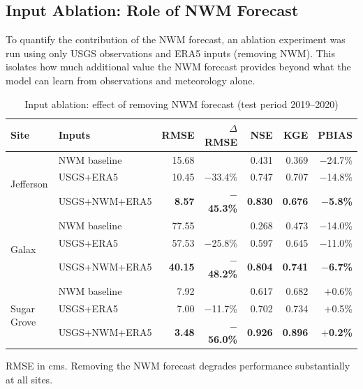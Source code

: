 \documentclass[11pt]{article}
\begin{document}
\subsection{Input Ablation: Role of NWM Forecast}

To quantify the contribution of the NWM forecast, an ablation experiment was run using only USGS observations and ERA5 inputs (removing NWM). This isolates how much additional value the NWM forecast provides beyond what the model can learn from observations and meteorology alone.

\begin{table}[h]
\centering
\caption{Input ablation: effect of removing NWM forecast (test period 2019--2020)}
\label{tab:ablation}
\begin{tabular}{ll rrrrr}
\toprule
\textbf{Site} & \textbf{Inputs} & \textbf{RMSE} & \textbf{$\Delta$RMSE} & \textbf{NSE} & \textbf{KGE} & \textbf{PBIAS} \\
\midrule
\multirow{3}{*}{Jefferson}
  & NWM baseline      & 15.68 &        & 0.431 & 0.369 & $-$24.7\% \\
  & USGS+ERA5         & 10.45 & \textcolor{improved}{$-$33.4\%} & 0.747 & 0.707 & $-$14.8\% \\
  & USGS+NWM+ERA5     & \textbf{8.57}  & \textcolor{improved}{$-$\textbf{45.3\%}} & \textbf{0.830} & \textbf{0.676} & \textbf{$-$5.8\%} \\
\midrule
\multirow{3}{*}{Galax}
  & NWM baseline      & 77.55 &        & 0.268 & 0.473 & $-$14.0\% \\
  & USGS+ERA5         & 57.53 & \textcolor{improved}{$-$25.8\%} & 0.597 & 0.645 & $-$11.0\% \\
  & USGS+NWM+ERA5     & \textbf{40.15} & \textcolor{improved}{$-$\textbf{48.2\%}} & \textbf{0.804} & \textbf{0.741} & \textbf{$-$6.7\%} \\
\midrule
\multirow{3}{*}{Sugar Grove}
  & NWM baseline      & 7.92  &        & 0.617 & 0.682 & $+$0.6\% \\
  & USGS+ERA5         & 7.00  & \textcolor{improved}{$-$11.7\%} & 0.702 & 0.734 & $+$0.5\% \\
  & USGS+NWM+ERA5     & \textbf{3.48}  & \textcolor{improved}{$-$\textbf{56.0\%}} & \textbf{0.926} & \textbf{0.896} & \textbf{$+$0.2\%} \\
\bottomrule
\end{tabular}
\vspace{0.3em}

{\footnotesize RMSE in cms. Removing the NWM forecast degrades performance substantially at all sites.}
\end{table}
\end{document}
